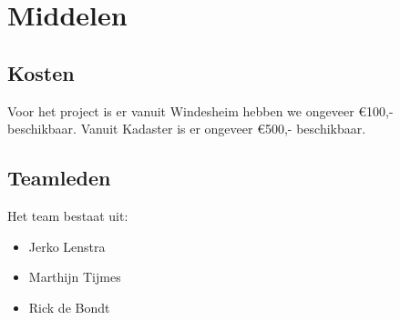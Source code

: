 \section{Middelen}
\subsection{Kosten}
Voor het project is er vanuit Windesheim hebben we ongeveer €100,- beschikbaar.
Vanuit Kadaster is er ongeveer €500,- beschikbaar.
\subsection{Teamleden}
Het team bestaat uit:

\begin{itemize}
        \item Jerko Lenstra
        \item Marthijn Tijmes
        \item Rick de Bondt
\end{itemize}
